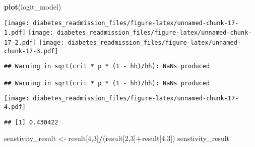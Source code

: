 \documentclass[]{article}
\newenvironment{Shaded}{\begin{snugshade}}{\end{snugshade}}
\newcommand{\KeywordTok}[1]{\textcolor[rgb]{0.13,0.29,0.53}{\textbf{#1}}}
\newcommand{\DataTypeTok}[1]{\textcolor[rgb]{0.13,0.29,0.53}{#1}}
\newcommand{\DecValTok}[1]{\textcolor[rgb]{0.00,0.00,0.81}{#1}}
\newcommand{\FloatTok}[1]{\textcolor[rgb]{0.00,0.00,0.81}{#1}}
\newcommand{\StringTok}[1]{\textcolor[rgb]{0.31,0.60,0.02}{#1}}
\newcommand{\CommentTok}[1]{\textcolor[rgb]{0.56,0.35,0.01}{\textit{#1}}}
\newcommand{\OperatorTok}[1]{\textcolor[rgb]{0.81,0.36,0.00}{\textbf{#1}}}
\newcommand{\NormalTok}[1]{#1}
\begin{document}
\begin{Shaded}
\begin{Highlighting}[]
\KeywordTok{plot}\NormalTok{(logit_model)}
\end{Highlighting}
\end{Shaded}

\texttt{[image: diabetes\_readmission\_files/figure-latex/unnamed-chunk-17-1.pdf]}
\texttt{[image: diabetes\_readmission\_files/figure-latex/unnamed-chunk-17-2.pdf]}
\texttt{[image: diabetes\_readmission\_files/figure-latex/unnamed-chunk-17-3.pdf]}

\begin{verbatim}
## Warning in sqrt(crit * p * (1 - hh)/hh): NaNs produced

## Warning in sqrt(crit * p * (1 - hh)/hh): NaNs produced
\end{verbatim}

\texttt{[image: diabetes\_readmission\_files/figure-latex/unnamed-chunk-17-4.pdf]}

\begin{Shaded}
\end{Shaded}

\begin{verbatim}
## [1] 0.430422
\end{verbatim}

\begin{Shaded}
\begin{Highlighting}[]
\NormalTok{senstivity_result <-}\StringTok{ }\NormalTok{result[}\DecValTok{4}\NormalTok{,}\DecValTok{3}\NormalTok{]}\OperatorTok{/}\NormalTok{(result[}\DecValTok{2}\NormalTok{,}\DecValTok{3}\NormalTok{]}\OperatorTok{+}\NormalTok{result[}\DecValTok{4}\NormalTok{,}\DecValTok{3}\NormalTok{])}
\NormalTok{senstivity_result}
\end{Highlighting}
\end{Shaded}
\end{document}
